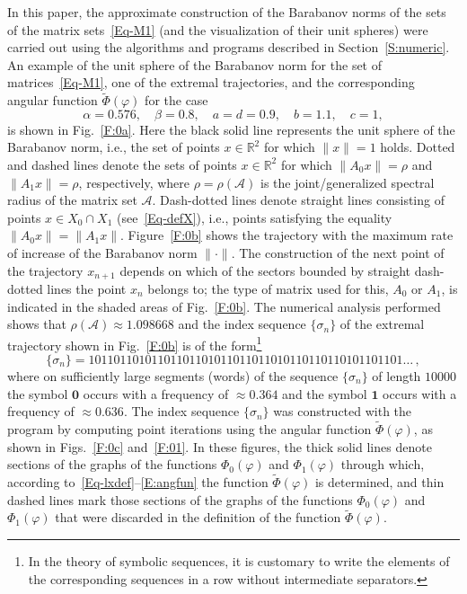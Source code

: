 \documentclass[a4paper,10pt,reqno]{amsart}
\newcommand{\setA}{\mathscr{A}}
\begin{document}
In this paper, the approximate construction of the Barabanov norms of the
sets of the matrix sets~\eqref{Eq-M1} (and the visualization of their unit
spheres) were carried out using the algorithms and programs described in
Section~\ref{S:numeric}. An example of the unit sphere of the Barabanov norm
for the set of matrices~\eqref{Eq-M1}, one of the extremal trajectories, and
the corresponding angular function $\tilde{\varPhi}(\varphi)$ for the case
\begin{equation}\label{mycase}
	\alpha=0.576,\quad \beta=0.8,\quad a=d=0.9,\quad b=1.1,\quad c=1,
\end{equation}
is shown in Fig.~\ref{F:0a}. Here the black solid line represents the unit
sphere of the Barabanov norm, i.e., the set of points $x\in\mathbb{R}^{2}$
for which $\|x\|=1$ holds. Dotted and dashed lines denote the sets of points
$x\in\mathbb{R}^{2}$ for which $\|A_{0}x\|=\rho$ and $\|A_{1}x \|=\rho$,
respectively, where $\rho=\rho(\setA)$ is the joint/generalized spectral
radius of the matrix set $\setA$. Dash-dotted lines denote straight lines
consisting of points $x\in X_{0}\cap X_{1}$ (see~\eqref{Eq-defX}), i.e.,
points satisfying the equality $\|A_{0}x\|=\|A_{1}x\|$. Figure~\ref{F:0b}
shows the trajectory with the maximum rate of increase of the Barabanov norm
$\|\cdot\|$. The construction of the next point of the trajectory $x_{n+1}$
depends on which of the sectors bounded by straight dash-dotted lines the
point $x_{n}$ belongs to; the type of matrix used for this, $A_{0}$ or
$A_{1}$, is indicated in the shaded areas of Fig.~\ref{F:0b}. The numerical
analysis performed shows that $\rho(\setA)\approx 1.098668$ and the index
sequence $\{\sigma_{n}\}$ of the extremal trajectory shown in
Fig.~\ref{F:0b} is of the form\footnote{In the theory of symbolic sequences,
it is customary to write the elements of the corresponding sequences in a row
without intermediate separators.}
\begin{equation}\label{E:indseq}
\{\sigma_{n}\}=10110110101101101101011011011010110110110101101101\ldots\,,
\end{equation}
where on sufficiently large segments (words) of the sequence $\{\sigma_{n}\}$
of length $10000$ the symbol $\boldsymbol{0}$ occurs with a frequency of
$\approx 0.364$ and the symbol $\boldsymbol{1}$  occurs with a frequency of
$\approx 0.636$. The index sequence $\{\sigma_{n}\}$ was constructed with the
program \texttt{} by computing point iterations
using the angular function $\tilde{\varPhi}(\varphi)$, as shown in
Figs.~\ref{F:0c} and~\ref{F:01}. In these figures, the thick solid lines
denote sections of the graphs of the functions $\varPhi_{0}(\varphi)$ and
$\varPhi_{1}(\varphi )$ through which, according
to~\eqref{Eq-lxdef}--\eqref{E:angfun} the function $\tilde{\varPhi}(\varphi)$
is determined, and thin dashed lines mark those sections of the graphs of the
functions $\varPhi_{0}(\varphi)$ and $\varPhi_{1}(\varphi)$ that were
discarded in the definition of the function $\tilde{\varPhi}(\varphi)$.
\end{document}
